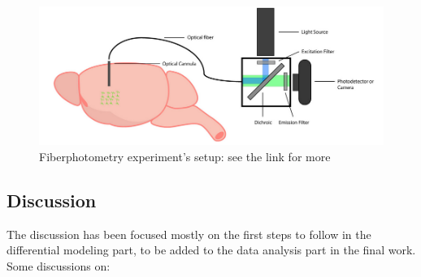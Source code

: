 \documentclass[a4paper]{article}
\begin{document}
	
		\begin{figure}[H]
		\begin{center}
			\includegraphics[scale=.60]{fiberphotometry.png} 
		\end{center} 
		\caption{Fiberphotometry experiment's setup: see the link for more}
	\end{figure}
	
	\subsection{Discussion}
	
	The discussion has been focused mostly on the first steps to follow in the differential modeling part, to be added to the data analysis part in the final work. Some discussions on:
	
\end{document}
